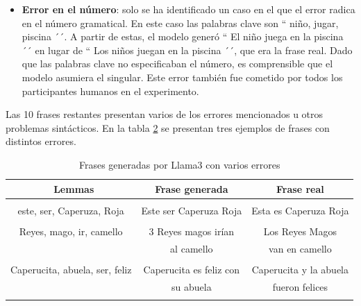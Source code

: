 \documentclass[11pt,spanish,listoffigures,listoftables]{tfgetsinf}
\begin{document}
\begin{itemize}
\begin{table}[!h]
\begin{center}
\begin{tabular}{ c | c | c }
\end{tabular}
\end{center}
\label{tab:erroresSujeto}
\end{table}

	\item \textbf{Error en el número}: solo se ha identificado un caso en el que el error radica en el número gramatical. En este caso las palabras clave son `` niño, jugar, piscina ´´. A partir de estas, el modelo generó `` El niño juega en la piscina ´´ en lugar de  `` Los niños juegan en la piscina ´´, que era la frase real. Dado que las palabras clave no especificaban el número, es comprensible que el modelo asumiera el singular. Este error también fue cometido por todos los participantes humanos en el experimento.
\end{itemize}

Las 10 frases restantes presentan varios de los errores mencionados u otros problemas sintácticos. En la tabla \ref{tab:erroresVariados} se presentan tres ejemplos de frases con distintos errores.

\begin{table}[!h]
\caption{Frases generadas por Llama3 con varios errores}
\begin{center}
\begin{tabular}{ c | c | c }
	\ Lemmas & Frase generada & Frase real \\
	\hline
	\hline
	 & & \\
	 este, ser, Caperuza, Roja & Este ser Caperuza Roja & Esta es Caperuza Roja  \\
	 & & \\
	Reyes, mago, ir, camello & 3 Reyes magos irían & Los Reyes Magos \\
	 & al camello & van en camello \\
	 & & \\
	Caperucita, abuela, ser, feliz & Caperucita es feliz con & Caperucita y la abuela  \\
	 & su abuela & fueron felices \\
	 & & \\

\end{tabular}
\end{center}
\label{tab:erroresVariados}
\end{table}

\end{document}

